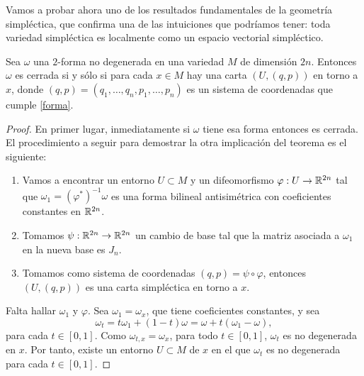 Vamos a probar ahora uno de los resultados fundamentales de la geometría simpléctica, que confirma una de las intuiciones que podríamos tener: toda variedad simpléctica es localmente como un espacio vectorial simpléctico.

\begin{thm}[Darboux]
  Sea $\omega$ una $2$-forma no degenerada en una variedad $M$ de dimensión $2n$. Entonces $\omega$ es cerrada si y sólo si para cada $x\in M$ hay una carta $(U,(q,p))$ en torno a $x$, donde $(q,p)=(q_1,\dots,q_n,p_1,\dots,p_n)$ es un sistema de coordenadas que cumple \eqref{forma}. 
\end{thm}
\begin{proof}
  En primer lugar, inmediatamente si $\omega$ tiene esa forma entonces es cerrada. El procedimiento a seguir para demostrar la otra implicación del teorema es el siguiente:
  \begin{enumerate}
    \item Vamos a encontrar un entorno $U \subset M$ y un difeomorfismo $\varphi : U \rightarrow \mathbb{R}^{2n}$ tal que $\omega_1= (\varphi^*)^{-1}\omega$ es una forma bilineal antisimétrica con coeficientes constantes en $\mathbb{R}^{2n}$.
    \item Tomamos $\psi: \mathbb{R}^{2n} \rightarrow \mathbb{R}^{2n}$ un cambio de base tal que la matriz asociada a $\omega_1$ en la nueva base es $J_n$. 
    \item Tomamos como sistema de coordenadas $(q,p)=\psi \circ \varphi$, entonces $(U,(q,p))$ es una carta simpléctica en torno a $x$.
  \end{enumerate}

\begin{center}
\end{center}

  Falta hallar $\omega_1$ y $\varphi$. Sea $\omega_1=\omega_x$, que tiene coeficientes constantes, y sea
  \begin{equation*}
    \omega_t=t\omega_1 + (1-t) \omega = \omega + t(\omega_1-\omega),
  \end{equation*}
  para cada $t\in[0,1]$. Como $\omega_{t,x}=\omega_x$, para todo $t \in [0,1]$, $\omega_t$ es no degenerada en $x$. Por tanto, existe un entorno $U \subset M$ de $x$ en el que $\omega_t$ es no degenerada para cada $t\in [0,1]$.


\end{proof}
